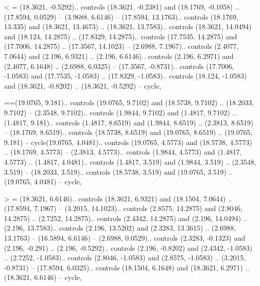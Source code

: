 < = {(18.3621, -0.5292).. controls (18.3621, -0.2381) and (18.1769, -0.1058) .. (17.8594, 0.0529) -- (3.9688, 6.6146) -- (17.8594, 13.1763).. controls (18.1769, 13.335) and (18.3621, 13.4673) .. (18.3621, 13.7583).. controls (18.3621, 14.0494) and (18.124, 14.2875) .. (17.8329, 14.2875).. controls (17.7535, 14.2875) and (17.7006, 14.2875) .. (17.3567, 14.1023) -- (2.6988, 7.1967).. controls (2.4077, 7.0644) and (2.196, 6.9321) .. (2.196, 6.6146).. controls (2.196, 6.2971) and (2.4077, 6.1648) .. (2.6988, 6.0325) -- (17.3567, -0.8731).. controls (17.7006, -1.0583) and (17.7535, -1.0583) .. (17.8329, -1.0583).. controls (18.124, -1.0583) and (18.3621, -0.8202) .. (18.3621, -0.5292) -- cycle},

{=}={(19.0765, 9.181).. controls (19.0765, 9.7102) and (18.5738, 9.7102) .. (18.2033, 9.7102) -- (2.3548, 9.7102).. controls (1.9844, 9.7102) and (1.4817, 9.7102) .. (1.4817, 9.181).. controls (1.4817, 8.6519) and (1.9844, 8.6519) .. (2.3813, 8.6519) -- (18.1769, 8.6519).. controls (18.5738, 8.6519) and (19.0765, 8.6519) .. (19.0765, 9.181) -- cycle(19.0765, 4.0481).. controls (19.0765, 4.5773) and (18.5738, 4.5773) .. (18.1769, 4.5773) -- (2.3813, 4.5773).. controls (1.9844, 4.5773) and (1.4817, 4.5773) .. (1.4817, 4.0481).. controls (1.4817, 3.519) and (1.9844, 3.519) .. (2.3548, 3.519) -- (18.2033, 3.519).. controls (18.5738, 3.519) and (19.0765, 3.519) .. (19.0765, 4.0481) -- cycle},

> = {(18.3621, 6.6146).. controls (18.3621, 6.9321) and (18.1504, 7.0644) .. (17.8594, 7.1967) -- (3.2015, 14.1023).. controls (2.8575, 14.2875) and (2.8046, 14.2875) .. (2.7252, 14.2875).. controls (2.4342, 14.2875) and (2.196, 14.0494) .. (2.196, 13.7583).. controls (2.196, 13.5202) and (2.3283, 13.3615) .. (2.6988, 13.1763) -- (16.5894, 6.6146) -- (2.6988, 0.0529).. controls (2.3283, -0.1323) and (2.196, -0.291) .. (2.196, -0.5292).. controls (2.196, -0.8202) and (2.4342, -1.0583) .. (2.7252, -1.0583).. controls (2.8046, -1.0583) and (2.8575, -1.0583) .. (3.2015, -0.8731) -- (17.8594, 6.0325).. controls (18.1504, 6.1648) and (18.3621, 6.2971) .. (18.3621, 6.6146) -- cycle},

